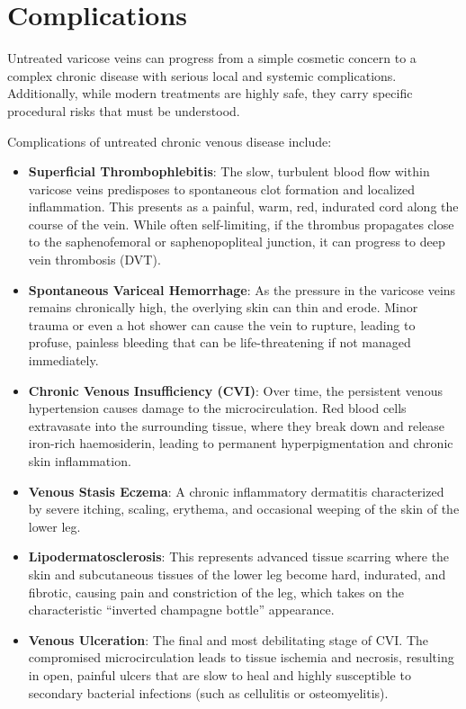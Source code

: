 \section*{Complications}
Untreated varicose veins can progress from a simple cosmetic concern to a complex chronic disease with serious local and systemic complications. Additionally, while modern treatments are highly safe, they carry specific procedural risks that must be understood.

Complications of untreated chronic venous disease include:
\begin{itemize}
\item \textbf{Superficial Thrombophlebitis}: The slow, turbulent blood flow within varicose veins predisposes to spontaneous clot formation and localized inflammation. This presents as a painful, warm, red, indurated cord along the course of the vein. While often self-limiting, if the thrombus propagates close to the saphenofemoral or saphenopopliteal junction, it can progress to deep vein thrombosis (DVT).
\item \textbf{Spontaneous Variceal Hemorrhage}: As the pressure in the varicose veins remains chronically high, the overlying skin can thin and erode. Minor trauma or even a hot shower can cause the vein to rupture, leading to profuse, painless bleeding that can be life-threatening if not managed immediately.
\item \textbf{Chronic Venous Insufficiency (CVI)}: Over time, the persistent venous hypertension causes damage to the microcirculation. Red blood cells extravasate into the surrounding tissue, where they break down and release iron-rich haemosiderin, leading to permanent hyperpigmentation and chronic skin inflammation.
\item \textbf{Venous Stasis Eczema}: A chronic inflammatory dermatitis characterized by severe itching, scaling, erythema, and occasional weeping of the skin of the lower leg.
\item \textbf{Lipodermatosclerosis}: This represents advanced tissue scarring where the skin and subcutaneous tissues of the lower leg become hard, indurated, and fibrotic, causing pain and constriction of the leg, which takes on the characteristic ``inverted champagne bottle'' appearance.
\item \textbf{Venous Ulceration}: The final and most debilitating stage of CVI. The compromised microcirculation leads to tissue ischemia and necrosis, resulting in open, painful ulcers that are slow to heal and highly susceptible to secondary bacterial infections (such as cellulitis or osteomyelitis).
\end{itemize}

